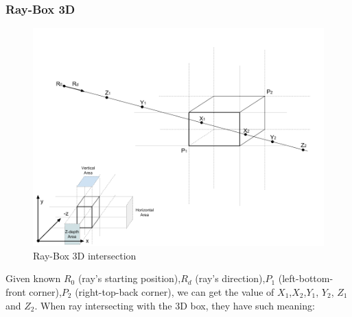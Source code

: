 \subsubsection{Ray-Box 3D}

\begin{figure}[H]
\caption{Ray-Box 3D intersection}
\label{fig:ray-box-3d}
\centering
\includegraphics[width=\textwidth, keepaspectratio]{Figures/ray-box-3d-intersection.png}
\decoRule
\end{figure}

Given known $R_0$ (ray's starting position),\enspace$R_d$ (ray's direction),\enspace$P_1$ (left-bottom-front corner),\enspace$P_2$ (right-top-back corner), we can get the value of $X_1$,\enspace$X_2$,\enspace$Y_1$, $Y_2$, $Z_1$ and $Z_2$. When ray intersecting with the 3D box, they have such meaning:

